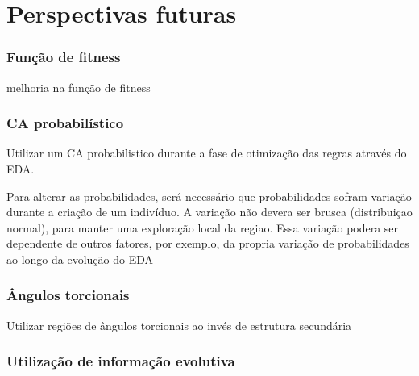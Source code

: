 \chapter{Perspectivas futuras}


\subsection{Função de fitness}

melhoria na função de fitness

\subsection{CA probabilístico}

Utilizar um CA probabilistico durante a fase de otimização das regras através do EDA.

Para alterar as probabilidades, será necessário que probabilidades sofram variação durante a criação de um indivíduo. A variação não devera ser brusca (distribuiçao normal), para manter uma exploração local da regiao. Essa variação podera ser dependente de outros fatores, por exemplo, da propria variação de probabilidades ao longo da evolução do EDA 

\subsection{Ângulos torcionais}

Utilizar regiões de ângulos torcionais ao invés de estrutura secundária

\subsection{Utilização de informação evolutiva}


